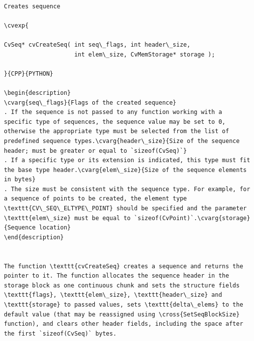 \begin{verbatim}

Creates sequence

\cvexp{

CvSeq* cvCreateSeq( int seq\_flags, int header\_size,
                    int elem\_size, CvMemStorage* storage );

}{CPP}{PYTHON}

\begin{description}
\cvarg{seq\_flags}{Flags of the created sequence}
. If the sequence is not passed to any function working with a specific type of sequences, the sequence value may be set to 0, otherwise the appropriate type must be selected from the list of predefined sequence types.\cvarg{header\_size}{Size of the sequence header; must be greater or equal to `sizeof(CvSeq)`}
. If a specific type or its extension is indicated, this type must fit the base type header.\cvarg{elem\_size}{Size of the sequence elements in bytes}
. The size must be consistent with the sequence type. For example, for a sequence of points to be created, the element type \texttt{CV\_SEQ\_ELTYPE\_POINT} should be specified and the parameter \texttt{elem\_size} must be equal to `sizeof(CvPoint)`.\cvarg{storage}{Sequence location}
\end{description}


The function \texttt{cvCreateSeq} creates a sequence and returns the pointer to it. The function allocates the sequence header in the storage block as one continuous chunk and sets the structure fields \texttt{flags}, \texttt{elem\_size}, \texttt{header\_size} and \texttt{storage} to passed values, sets \texttt{delta\_elems} to the default value (that may be reassigned using \cross{SetSeqBlockSize} function), and clears other header fields, including the space after the first `sizeof(CvSeq)` bytes.


\end{verbatim}
\label{SetSeqBlockSize}
